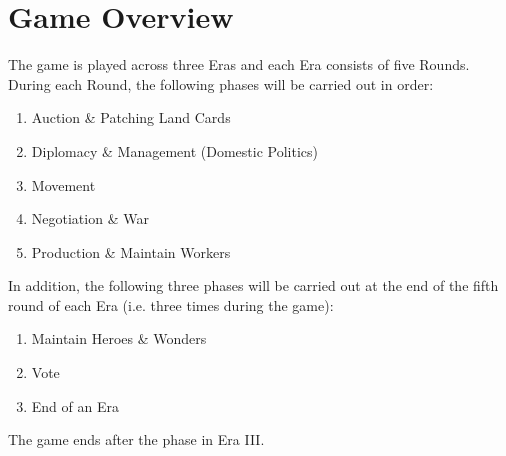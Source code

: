 \documentclass[10pt,twocolumn]{article}
\begin{document}
\section{Game Overview}
The game is played across three Eras and each Era consists of five Rounds. During each Round, the following phases will be carried out in order:
\begin{enumerate}
\item Auction \& Patching Land Cards
\item Diplomacy \& Management (Domestic Politics)
\item Movement
\item Negotiation \& War
\item Production \& Maintain Workers
\end{enumerate}
In addition, the following three phases will be carried out at the end of the fifth round of each Era (i.e. three times during the game):
\begin{enumerate}[resume]
\item Maintain Heroes \& Wonders
\item Vote
\item End of an Era
\end{enumerate}

The game ends after the  phase in Era III.
\end{document}
